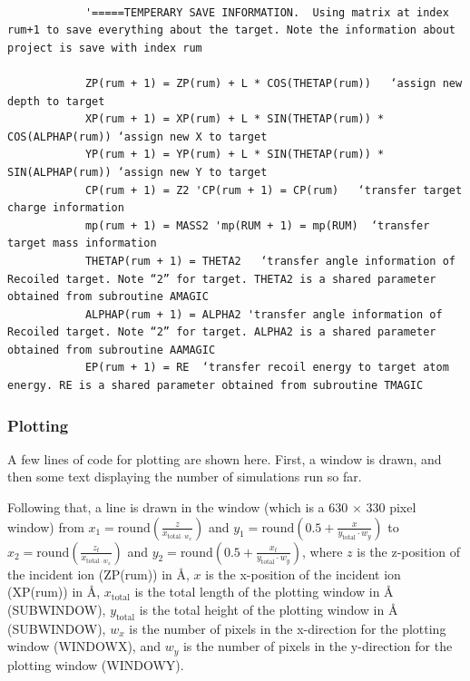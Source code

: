 \documentclass[10pt, reqno]{exam}
\begin{document}
\begin{verbatim}   
            
            '=====TEMPERARY SAVE INFORMATION.  Using matrix at index rum+1 to save everything about the target. Note the information about project is save with index rum
    
            ZP(rum + 1) = ZP(rum) + L * COS(THETAP(rum))   ‘assign new depth to target
            XP(rum + 1) = XP(rum) + L * SIN(THETAP(rum)) * COS(ALPHAP(rum)) ‘assign new X to target 
            YP(rum + 1) = YP(rum) + L * SIN(THETAP(rum)) * SIN(ALPHAP(rum)) ‘assign new Y to target
            CP(rum + 1) = Z2 'CP(rum + 1) = CP(rum)   ‘transfer target charge information
            mp(rum + 1) = MASS2 'mp(RUM + 1) = mp(RUM)  ‘transfer target mass information
            THETAP(rum + 1) = THETA2   ‘transfer angle information of Recoiled target. Note “2” for target. THETA2 is a shared parameter obtained from subroutine AMAGIC 
            ALPHAP(rum + 1) = ALPHA2 'transfer angle information of  Recoiled target. Note “2” for target. ALPHA2 is a shared parameter obtained from subroutine AAMAGIC
            EP(rum + 1) = RE  ‘transfer recoil energy to target atom energy. RE is a shared parameter obtained from subroutine TMAGIC
\end{verbatim}

\subsubsection{Plotting}

A few lines of code for plotting are shown here. First, a window is drawn, and then some text displaying the number of simulations run so far. \par

Following that, a line is drawn in the window (which is a 630 $\times$ 330 pixel window) from $x_1 = \text{round}\left(\frac{z}{x_{\text{total}\cdot w_x}}\right)$ and $y_1 = \text{round}\left(0.5 + \frac{x}{y_{\text{total}}\cdot w_y}\right)$ to $x_2 = \text{round}\left(\frac{z_t}{x_{\text{total}\cdot w_x}}\right)$ and $y_2 = \text{round}\left(0.5 + \frac{x_t}{y_{\text{total}}\cdot w_y}\right)$, where $z$ is the z-position of the incident ion (ZP(rum)) in \si{\angstrom}, $x$ is the x-position of the incident ion (XP(rum)) in \si{\angstrom}, $x_{\text{total}}$ is the total length of the plotting window in \si{\angstrom} (SUBWINDOW), $y_{\text{total}}$ is the total height of the plotting window in \si{\angstrom} (SUBWINDOW), $w_x$ is the number of pixels in the x-direction for the plotting window (WINDOWX), and $w_y$ is the number of pixels in the y-direction for the plotting window (WINDOWY). \par
\end{document}
